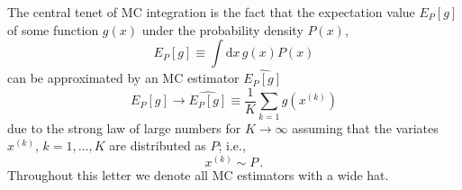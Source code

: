 \documentclass[aps,prd,reprint,nofootinbib,preprintnumbers]{revtex4}
\newcommand{\rmdx}[1]{\mbox{d} #1 \,} %
\newcommand{\est}[1]{\widehat{#1}}
\begin{document}
The central tenet of MC integration is the fact that the expectation value $E_P[g]$ of some function
$g(x)$ under the probability density $P(x)$,
\begin{equation}
    E_P[g] \equiv \int \rmdx{x} g(x) P(x)
\end{equation}
can be approximated \cite{MCSM-2004} by an MC estimator $\est{E_P[g]}$
\begin{equation}
    \label{eq:mc-id}
    E_P[g] \to \widehat{E_P[g]} \equiv \frac{1}{K} \sum_{k=1} g(x^{(k)})
\end{equation}
due to the strong law of large numbers for $K \to \infty$ assuming
that the variates $x^{(k)}$, $k = 1, \dots, K$ are distributed as
$P$; i.e.,
\begin{equation}
    x^{(k)} \sim P\,.
\end{equation}
Throughout this letter we denote all MC estimators with a wide hat.\\
\end{document}
